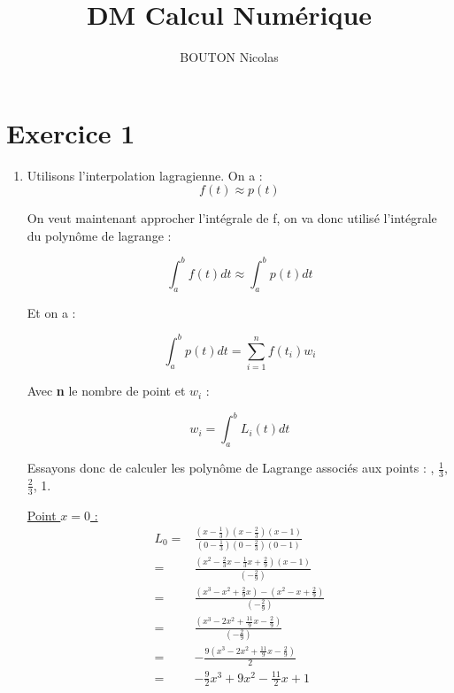 \documentclass[12pt, letterpaper]{article}
\title{DM Calcul Numérique}
\author{BOUTON Nicolas}
\begin{document}
\maketitle

\section*{Exercice 1}

\begin{enumerate}

\item 

  Utilisons l'interpolation lagragienne.\newline
  On a :
  $$ f(t) \approx p(t) $$

  On veut maintenant approcher l'intégrale de f, on va donc utilisé
  l'intégrale du polynôme de lagrange :

  \begin{equation*}
    \int_a^b {f(t) dt} \approx \int_a^b {p(t) dt}
  \end{equation*}

  Et on a :

  \begin{equation*}
    \int_a^b {p(t) dt} = \sum_{i = 1}^{n} {f(t_i)w_i}
  \end{equation*}

  Avec \textbf{n} le nombre de point et $w_i$ :

  \begin{equation*}
    w_i = \int_a^b {L_i(t)dt}
  \end{equation*}

Essayons donc de calculer les polynôme de Lagrange associés aux points
: , $\frac{1}{3}$, $\frac{2}{3}$, 1.

\underline{Point $x = 0$ :}
\begin{equation*}
  \begin{split}
    L_0 = & \frac{(x - \frac{1}{3}) (x - \frac{2}{3}) (x - 1)}
    {(0 - \frac{1}{3}) (0 - \frac{2}{3}) (0 - 1)} \\
    = & \frac{(x^2 - \frac{2}{3}x - \frac{1}{3}x + \frac{2}{9}) (x - 1)}
    {(- \frac{2}{9})} \\
    = & \frac{(x^3 - x^2 + \frac{2}{9}x) - (x^2 - x + \frac{2}{9}) }
    {(- \frac{2}{9})} \\
    = & \frac{(x^3 - 2x^2 + \frac{11}{9}x - \frac{2}{9}) }
    {(- \frac{2}{9})} \\
    = & - \frac{ 9 (x^3 - 2x^2 + \frac{11}{9}x - \frac{2}{9}) }
    {2} \\
    = & - \frac{9}{2}x^3 + 9 x^2 - \frac{11}{2}x + 1
  \end{split}
\end{equation*}


\end{enumerate}
\end{document}
